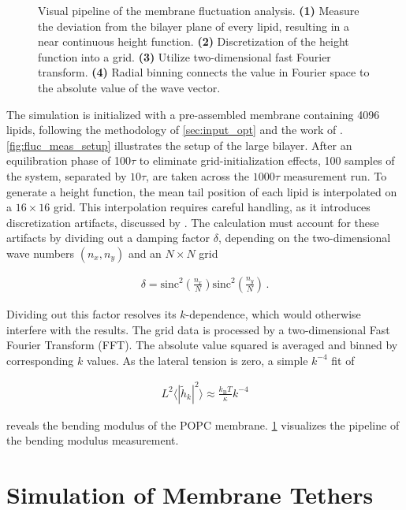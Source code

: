 \documentclass[
    11pt,
    a4paper,
    oneside,        %
    BCOR=10mm,      %
    parskip=half,   %
    listof=nototoc,   %
    bibliography=totoc %
]{scrreprt}
\begin{document}
\begin{figure}[t]
    \caption[Visual pipeline for membrane fluctuation analysis.]{ Visual pipeline of the membrane fluctuation analysis. \textbf{(1)} Measure the deviation from the bilayer plane of every lipid, resulting in a near continuous height function. \textbf{(2)} Discretization of the height function into a grid. \textbf{(3)} Utilize two-dimensional fast Fourier transform. \textbf{(4)} Radial binning connects the value in Fourier space to the absolute value of the wave vector.}
    \label{fig:spectrum_pipeline_final_aligned}
\end{figure}

The simulation is initialized with a pre-assembled membrane containing 4096 lipids, following the methodology of \cref{sec:input_opt} and the work of \citeauthor{Cooke_bending_mod} \cite{Cooke_bending_mod}. \cref{fig:fluc_meas_setup} illustrates the setup of the large bilayer. After an equilibration phase of 100$\tau$ to eliminate grid-initialization effects, 100 samples of the system, separated by $10 \tau$, are taken across the $1000\tau$ measurement run. To generate a height function, the mean tail position of each lipid is interpolated on a $16 \times 16$ grid. This interpolation requires careful handling, as it introduces discretization artifacts, discussed by \citeauthor{Cooke_bending_mod} \cite{Cooke_bending_mod}. The calculation must account for these artifacts by dividing out a damping factor $\delta$, depending on the two-dimensional wave numbers $(n_x, n_y)$ and an $N \times N$ grid

\begin{align}
    \delta = \mathrm{sinc}^2\left(\frac{n_x}{N}\right)\mathrm{sinc}^2\left(\frac{n_y}{N}\right)\, .
\end{align}

Dividing out this factor resolves its $k$-dependence, which would otherwise interfere with the results. The grid data is processed by a two-dimensional Fast Fourier Transform (FFT). The absolute value squared is averaged and binned by corresponding $k$ values. As the lateral tension is zero, a simple $k^{-4}$ fit of

\begin{align}
    L^2 \langle |\tilde{h}_k|^2 \rangle \approx \frac{k_\text{B}T}{\kappa} k^{-4}
\end{align}

reveals the bending modulus of the POPC membrane. \cref{fig:spectrum_pipeline_final_aligned} visualizes the pipeline of the bending modulus measurement.  

\section{Simulation of Membrane Tethers} \label{sec:methods_sim_tethers}
\end{document}
